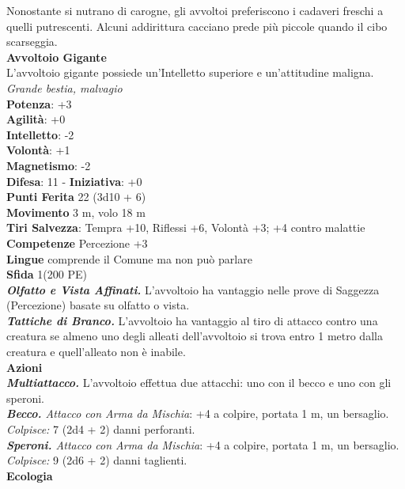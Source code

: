 \begin{multicols}{2}
Nonostante si nutrano di carogne, gli avvoltoi preferiscono i cadaveri freschi a quelli putrescenti. Alcuni addirittura cacciano prede più piccole quando il cibo scarseggia.\\

\medskip\textbf{Avvoltoio Gigante}\\
L'avvoltoio gigante possiede un'Intelletto superiore e un'attitudine maligna.\\
\emph{Grande bestia, malvagio}\\
\textbf{Potenza}: +3\\
\textbf{Agilità}: +0\\
\textbf{Intelletto}: -2\\
\textbf{Volontà}: +1\\
\textbf{Magnetismo}: -2\\
\textbf{Difesa}: 11 - \textbf{Iniziativa}: +0\\
\textbf{Punti Ferita} 22 (3d10 + 6)\\
\textbf{Movimento} 3 m, volo 18 m\\
\textbf{Tiri Salvezza}: Tempra +10, Riflessi +6, Volontà +3; +4 contro malattie\\
\textbf{Competenze} Percezione +3\\
\textbf{Lingue} comprende il Comune ma non può parlare\\
\textbf{Sfida} 1(200 PE)\smallskip\\
\emph{\textbf{Olfatto e Vista Affinati.}} L'avvoltoio ha vantaggio nelle prove di Saggezza (Percezione) basate su olfatto o vista.\\
\emph{\textbf{Tattiche di Branco.}} L'avvoltoio ha vantaggio al tiro di attacco contro una creatura se almeno uno degli alleati dell'avvoltoio si trova entro 1 metro dalla creatura e quell'alleato non è inabile.\\
\smallskip\textbf{Azioni}\\
\emph{\textbf{Multiattacco.}} L'avvoltoio effettua due attacchi: uno con il becco e uno con gli speroni.\\
\emph{\textbf{Becco.} Attacco con Arma da Mischia}: +4 a colpire, portata 1 m, un bersaglio.\\
\emph{Colpisce:} 7 (2d4 + 2) danni perforanti.\\
\emph{\textbf{Speroni.} Attacco con Arma da Mischia}: +4 a colpire, portata 1 m, un bersaglio.\\
\emph{Colpisce:} 9 (2d6 + 2) danni taglienti.\\
\textbf{Ecologia}\\

\end{multicols}
